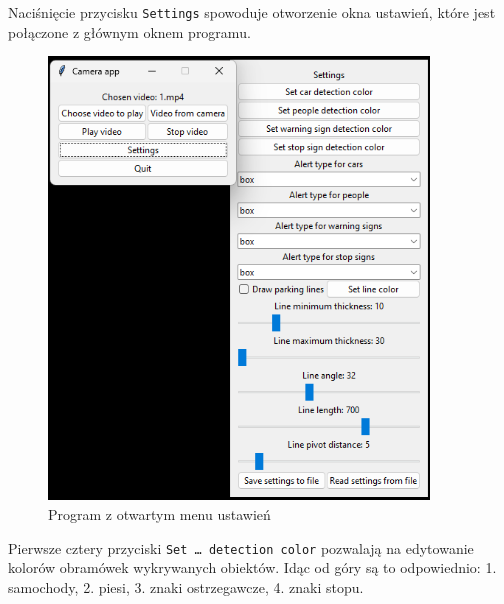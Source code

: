 \newpage

Naciśnięcie przycisku \verb|Settings| spowoduje otworzenie okna ustawień, które jest połączone z głównym oknem programu.

\begin{figure}[H]
	\centering
	\includegraphics[width=0.9\textwidth]{Img/manual/settings_opened.png}
	\caption{Program z otwartym menu ustawień}
	\label{fig:settings_opened}
\end{figure}

\newpage

Pierwsze cztery przyciski \verb|Set … detection color| pozwalają na edytowanie kolorów obramówek wykrywanych obiektów.
Idąc od góry są to odpowiednio: 1. samochody, 2. piesi, 3. znaki ostrzegawcze, 4. znaki stopu.

